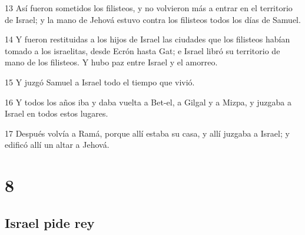 \par 13 Así fueron sometidos los filisteos, y no volvieron más a entrar en el territorio de Israel; y la mano de Jehová estuvo contra los filisteos todos los días de Samuel.
\par 14 Y fueron restituidas a los hijos de Israel las ciudades que los filisteos habían tomado a los israelitas, desde Ecrón hasta Gat; e Israel libró su territorio de mano de los filisteos. Y hubo paz entre Israel y el amorreo.
\par 15 Y juzgó Samuel a Israel todo el tiempo que vivió.
\par 16 Y todos los años iba y daba vuelta a Bet-el, a Gilgal y a Mizpa, y juzgaba a Israel en todos estos lugares.
\par 17 Después volvía a Ramá, porque allí estaba su casa, y allí juzgaba a Israel; y edificó allí un altar a Jehová.

\chapter{8}

\section*{Israel pide rey}

